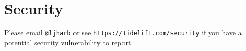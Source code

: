 \chapter{Security }
\hypertarget{md_frontend_2node__modules_2resolve_2_s_e_c_u_r_i_t_y}{}\label{md_frontend_2node__modules_2resolve_2_s_e_c_u_r_i_t_y}
\label{md_frontend_2node__modules_2resolve_2_s_e_c_u_r_i_t_y_autotoc_md6260}%
%


Please email \href{https://github.com/ljharb}{\texttt{@ljharb}} or see \href{https://tidelift.com/security}{\texttt{https\+://tidelift.\+com/security}} if you have a potential security vulnerability to report. 